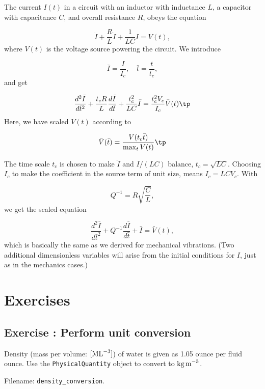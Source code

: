 \documentclass[graybox,envcountchap,sectrefs,final]{svmonodo}
\newcounter{doconce:movie:counter}
\newenvironment{doconceexercise}{}{}
\newcounter{doconceexercisecounter}
\begin{document}
The current $I(t)$ in a
circuit with an inductor with inductance $L$, a capacitor with
capacitance $C$, and overall resistance $R$, obeys the equation

\begin{equation}
\ddot I + \frac{R}{L}\dot I + \frac{1}{LC}I =  V(t),
\end{equation}
where $V(t)$ is the voltage source powering the circuit.
We introduce

\[ \bar I=\frac{I}{I_c},\quad \bar t = \frac{t}{t_c},\]
and get

\[ \frac{d^2\bar I}{d\bar t^2} + \frac{t_c R}{L}\frac{d\bar I}{d\bar t}
+ \frac{t_c^2}{LC}\bar I = \frac{t_c^2V_c}{I_c} \bar V(t)\tp\]
Here, we have scaled $V(t)$ according to

\[ \bar V(\bar t) = \frac{V(t_c\bar t)}{\max_t V(t)}\tp\]

The time scale $t_c$ is chosen to make $\ddot I$ and $I/(LC)$ balance,
$t_c = \sqrt{LC}$.
Choosing $I_c$ to make the coefficient in the source term of unit size,
means $I_c = LCV_c$.
With

\[ Q^{-1} = R\sqrt{\frac{C}{L}},\]
we get the scaled equation

\begin{equation}
\frac{d^2\bar I}{d\bar t^2} + Q^{-1}\frac{d\bar I}{d\bar t}
+ \bar I = \bar V(t),
\end{equation}
which is basically the same as we derived for mechanical vibrations.
(Two additional dimensionless variables will arise from the initial
conditions for $I$, just as in the mechanics cases.)

\section{Exercises}



\begin{doconceexercise}

\subsection*{Exercise \thedoconceexercisecounter: Perform unit conversion}

\label{sec:scale:exer:US2SI1}

Density (mass per volume: $[\hbox{ML}^{-3}]$) of water is
given as 1.05 ounce per fluid ounce. Use the \texttt{PhysicalQuantity} object
to convert to $\hbox{kg\,m}^{-3}$.


\noindent Filename: \Verb!density_conversion!.

\end{doconceexercise}
\end{document}
